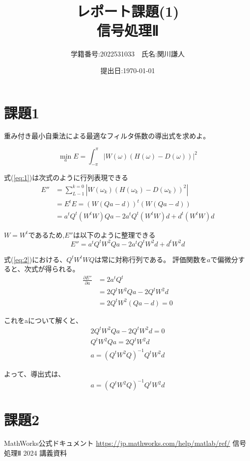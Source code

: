 \documentclass[a4paper,11pt]{ltjsarticle}
\begin{document}
\title{レポート課題(1) \\ 信号処理Ⅱ}

\author{学籍番号:2022531033　氏名:関川謙人}
\date{提出日:\today}
\maketitle

\section{課題1}
重み付き最小自乗法による最適なフィルタ係数の導出式を求めよ。

\begin{equation} \label{eq:1}
  \min_{a} E = \int_{-\pi}^{\pi} |W(\omega)(H(\omega)-D(\omega))|^2
\end{equation}

式(\ref{eq:1})は次式のように行列表現できる
\begin{align}
  E'' &= \sum_{L-1}^{k=0} |W(\omega_{k})(H(\omega_{k})-D(\omega_{k}))^2| \nonumber \\
      &= E^{t}E = (W(Qa - d))^{t}(W(Qa - d)) \nonumber \\
      &= a^{t}Q^{t}(W^{t}W)Qa - 2a^{t}Q^{t}(W^{t} W)d + d^{t}(W^{t}W)d \label{eq:2}
\end{align}

$W = W^{t}$であるため,$E''$は以下のように整理できる
\begin{equation}
  E'' = a^{t}Q^{t}W^{2}Qa - 2a^{t}Q^{t}W^{2}d + d^{t}W^{2}d \label{eq:3}
\end{equation}

式(\ref{eq:2})における、$Q^{t}W^{t}WQ$は常に対称行列である。
評価関数を$a$で偏微分すると、次式が得られる。
\begin{align*}
  \frac{\partial E''}{\partial a} &= 2a^{t}Q^{t} \\
  &= 2Q^{t}W^{2}Qa - 2Q^{t}W^{2}d \\
  &= 2Q^{t}W^{2}(Qa - d) = 0
\end{align*}

これをaについて解くと、
\begin{gather*}
  2Q^{t}W^{2}Qa - 2Q^{t}W^{2}d = 0 \\
  Q^{t}W^{2}Qa = 2Q^{t}W^{2}d \\
  a = (Q^{t}W^{2}Q)^{-1}Q^{t}W^{2}d
\end{gather*}

よって、導出式は、
\begin{equation*}
  a = (Q^{t}W^{2}Q)^{-1}Q^{t}W^{2}d
\end{equation*}

\section{課題2}

\begin{thebibliography}{9}
	 MathWorks公式ドキュメント \url{https://jp.mathworks.com/help/matlab/ref/}
	 信号処理Ⅱ 2024 講義資料
\end{thebibliography}
\end{document}
